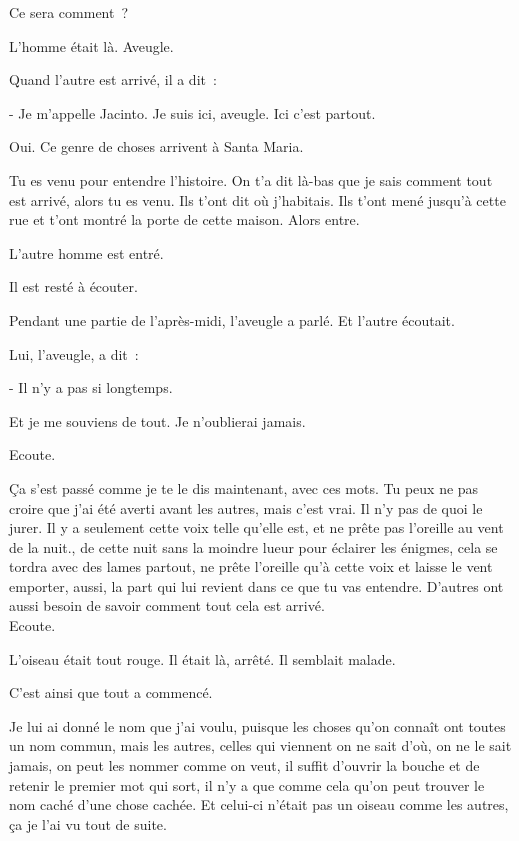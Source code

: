 Ce sera comment~?

\pagebreak

L'homme était là. Aveugle.

Quand l'autre est arrivé, il a dit~:

- Je m'appelle Jacinto. Je suis ici, aveugle. Ici c'est partout.

Oui. Ce genre de choses arrivent à Santa Maria.

Tu es venu pour entendre l'histoire. On t'a dit là-bas que je sais
comment tout est arrivé, alors tu es venu. Ils t'ont dit où j'habitais.
Ils t'ont mené jusqu'à cette rue et t'ont montré la porte de cette
maison. Alors entre.

L'autre homme est entré.

Il est resté à écouter.

Pendant une partie de l'après-midi, l'aveugle a parlé. Et l'autre
écoutait.

Lui, l'aveugle, a dit~:

- Il n'y a pas si longtemps.

Et je me souviens de tout. Je n'oublierai jamais.

Ecoute.

Ça s'est passé comme je te le dis maintenant, avec ces mots. Tu peux ne
pas croire que j'ai été averti avant les autres, mais c'est vrai. Il n'y
pas de quoi le jurer. Il y a seulement cette voix telle qu'elle est, et
ne prête pas l'oreille au vent de la nuit., de cette nuit sans la
moindre lueur pour éclairer les énigmes, cela se tordra avec des lames
partout, ne prête l'oreille qu'à cette voix et laisse le vent emporter,
aussi, la part qui lui revient dans ce que tu vas entendre. D'autres ont
aussi besoin de savoir comment tout cela est arrivé.\\

Ecoute.

L'oiseau était tout rouge. Il était là, arrêté. Il semblait malade.

C'est ainsi que tout a commencé.

Je lui ai donné le nom que j'ai voulu, puisque les choses qu'on connaît
ont toutes un nom commun, mais les autres, celles qui viennent on ne
sait d'où, on ne le sait jamais, on peut les nommer comme on veut, il
suffit d'ouvrir la bouche et de retenir le premier mot qui sort, il n'y
a que comme cela qu'on peut trouver le nom caché d'une chose cachée. Et
celui-ci n'était pas un oiseau comme les autres, ça je l'ai vu tout de
suite.\\

